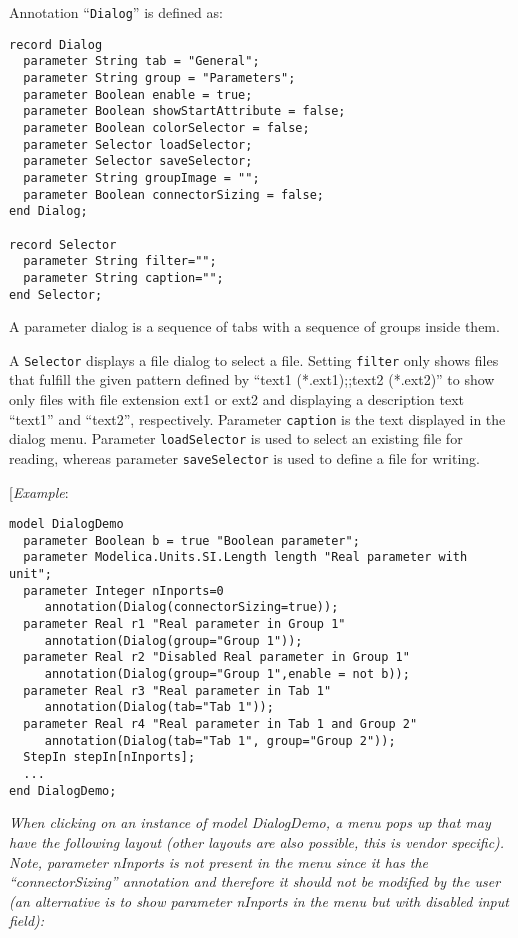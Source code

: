 Annotation ``\lstinline!Dialog!'' is defined as:

\begin{lstlisting}[language=modelica]
record Dialog
  parameter String tab = "General";
  parameter String group = "Parameters";
  parameter Boolean enable = true;
  parameter Boolean showStartAttribute = false;
  parameter Boolean colorSelector = false;
  parameter Selector loadSelector;
  parameter Selector saveSelector;
  parameter String groupImage = "";
  parameter Boolean connectorSizing = false;
end Dialog;

record Selector
  parameter String filter="";
  parameter String caption="";
end Selector;
\end{lstlisting}
A parameter dialog is a sequence of tabs with a sequence of groups
inside them.

A \lstinline!Selector! displays a file dialog to select a file. Setting \lstinline!filter! only
shows files that fulfill the given pattern defined by ``text1
(*.ext1);;text2 (*.ext2)'' to show only files with file extension
ext1 or ext2 and displaying a description text ``text1'' and
``text2'', respectively. Parameter \lstinline!caption! is the text displayed in the
dialog menu. Parameter \lstinline!loadSelector! is used to select an existing file
for reading, whereas parameter \lstinline!saveSelector! is used to define a file for
writing.

{[}\emph{Example}:

\begin{lstlisting}[language=modelica]
model DialogDemo
  parameter Boolean b = true "Boolean parameter";
  parameter Modelica.Units.SI.Length length "Real parameter with unit";
  parameter Integer nInports=0
     annotation(Dialog(connectorSizing=true));
  parameter Real r1 "Real parameter in Group 1"
     annotation(Dialog(group="Group 1"));
  parameter Real r2 "Disabled Real parameter in Group 1"
     annotation(Dialog(group="Group 1",enable = not b));
  parameter Real r3 "Real parameter in Tab 1"
     annotation(Dialog(tab="Tab 1"));
  parameter Real r4 "Real parameter in Tab 1 and Group 2"
     annotation(Dialog(tab="Tab 1", group="Group 2"));
  StepIn stepIn[nInports];
  ...
end DialogDemo;
\end{lstlisting}
\emph{When clicking on an instance of model DialogDemo, a menu pops up
that may have the following layout (other layouts are also possible,
this is vendor specific). Note, parameter nInports is not present in the
menu since it has the ``connectorSizing'' annotation and therefore it
should not be modified by the user (an alternative is to show parameter
nInports in the menu but with disabled input field): }

